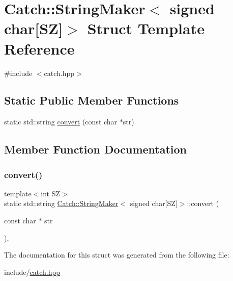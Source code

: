 \hypertarget{structCatch_1_1StringMaker_3_01signed_01char[SZ]_4}{}\section{Catch\+:\+:String\+Maker$<$ signed char\mbox{[}SZ\mbox{]}$>$ Struct Template Reference}
\label{structCatch_1_1StringMaker_3_01signed_01char[SZ]_4}


{\ttfamily \#include $<$catch.\+hpp$>$}

\subsection*{Static Public Member Functions}
\begin{DoxyCompactItemize}
\item 
static std\+::string \mbox{\hyperlink{structCatch_1_1StringMaker_3_01signed_01char[SZ]_4_ac17d7559af1b1177bae20c1ee028838b}{convert}} (const char $\ast$str)
\end{DoxyCompactItemize}


\subsection{Member Function Documentation}
\mbox{\label{structCatch_1_1StringMaker_3_01signed_01char[SZ]_4_ac17d7559af1b1177bae20c1ee028838b}} 
\subsubsection{\texorpdfstring{convert()}{convert()}}
{\footnotesize\ttfamily template$<$int SZ$>$ \\
static std\+::string \mbox{\hyperlink{structCatch_1_1StringMaker}{Catch\+::\+String\+Maker}}$<$ signed char\mbox{[}SZ\mbox{]}$>$\+::convert (\begin{DoxyParamCaption}\item[{const char $\ast$}]{str }\end{DoxyParamCaption})\hspace{0.3cm}{\ttfamily [inline]}, {\ttfamily [static]}}



The documentation for this struct was generated from the following file\+:\begin{DoxyCompactItemize}
\item 
include/\mbox{\hyperlink{catch_8hpp}{catch.\+hpp}}\end{DoxyCompactItemize}
